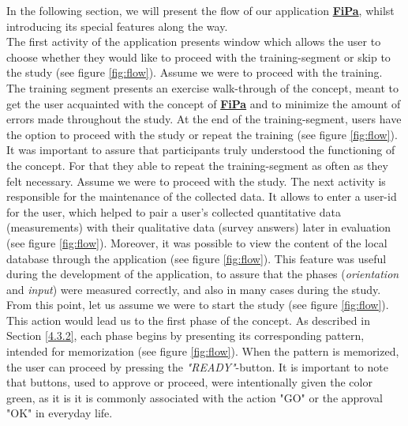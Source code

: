 In the following section, we will present the flow of our application \underline{\textbf{FiPa}}, whilst introducing its special features along the way. \\

The first activity of the application presents window which allows the user to choose whether they would like to proceed with the training-segment or skip to the study (see figure \ref{fig:flow}). Assume we were to proceed with the training. The training segment presents an exercise walk-through of the concept, meant to get the user acquainted with the concept of \underline{\textbf{FiPa}} and to minimize the amount of errors made throughout the study. At the end of the training-segment, users have the option to proceed with the study or repeat the training (see figure \ref{fig:flow}). It was important to assure that participants truly understood the functioning of the concept. For that they able to repeat the training-segment as often as they felt necessary. Assume we were to proceed with the study. The next activity is responsible for the maintenance of the collected data. It allows to enter a user-id for the user, which helped to pair a user's collected quantitative data (measurements) with their qualitative data (survey answers) later in evaluation (see figure \ref{fig:flow}). Moreover, it was possible to view the content of the local database through the application (see figure \ref{fig:flow}). This feature was useful during the development of the application, to assure that the phases (\textit{orientation} and \textit{input}) were measured correctly, and also in many cases during the study. From this point, let us assume we were to start the study (see figure \ref{fig:flow}). This action would lead us to the first phase of the concept. As described in Section \ref{4.3.2}, each phase begins by presenting its corresponding pattern, intended for memorization (see figure \ref{fig:flow}). When the pattern is memorized, the user can proceed by pressing the \textit{"READY"}-button. It is important to note that buttons, used to approve or proceed, were intentionally given the color green, as it is it is commonly associated with the action "GO" or the approval "OK" in everyday life.\\

